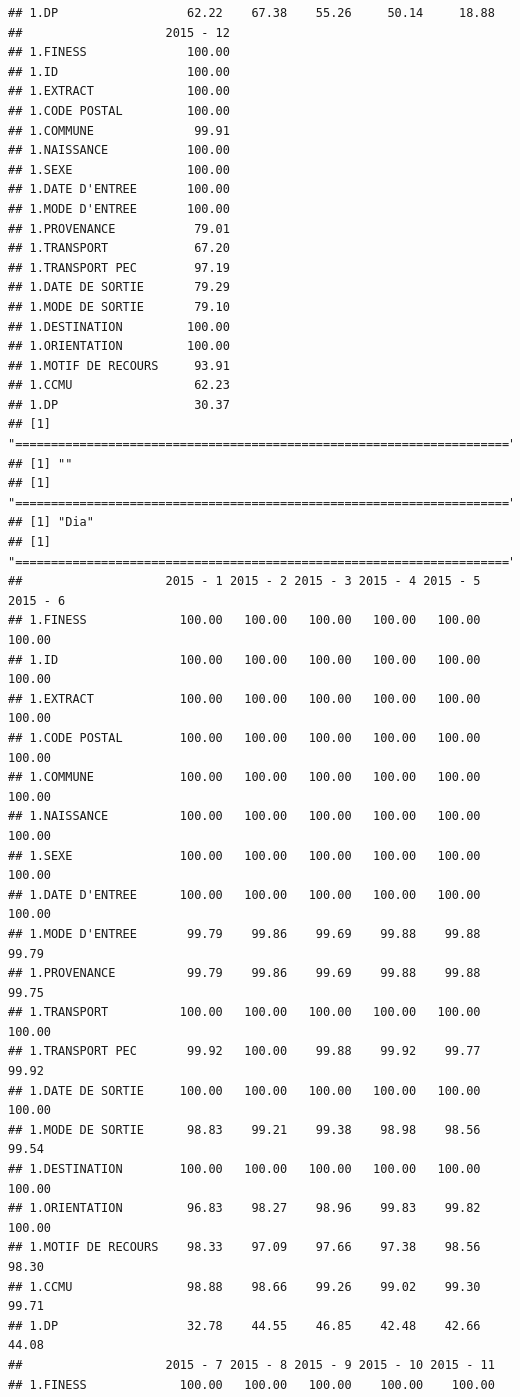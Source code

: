 \documentclass[]{article}
\begin{document}
\begin{verbatim}
## 1.DP                  62.22    67.38    55.26     50.14     18.88
##                    2015 - 12
## 1.FINESS              100.00
## 1.ID                  100.00
## 1.EXTRACT             100.00
## 1.CODE POSTAL         100.00
## 1.COMMUNE              99.91
## 1.NAISSANCE           100.00
## 1.SEXE                100.00
## 1.DATE D'ENTREE       100.00
## 1.MODE D'ENTREE       100.00
## 1.PROVENANCE           79.01
## 1.TRANSPORT            67.20
## 1.TRANSPORT PEC        97.19
## 1.DATE DE SORTIE       79.29
## 1.MODE DE SORTIE       79.10
## 1.DESTINATION         100.00
## 1.ORIENTATION         100.00
## 1.MOTIF DE RECOURS     93.91
## 1.CCMU                 62.23
## 1.DP                   30.37
## [1] "====================================================================="
## [1] ""
## [1] "====================================================================="
## [1] "Dia"
## [1] "====================================================================="
##                    2015 - 1 2015 - 2 2015 - 3 2015 - 4 2015 - 5 2015 - 6
## 1.FINESS             100.00   100.00   100.00   100.00   100.00   100.00
## 1.ID                 100.00   100.00   100.00   100.00   100.00   100.00
## 1.EXTRACT            100.00   100.00   100.00   100.00   100.00   100.00
## 1.CODE POSTAL        100.00   100.00   100.00   100.00   100.00   100.00
## 1.COMMUNE            100.00   100.00   100.00   100.00   100.00   100.00
## 1.NAISSANCE          100.00   100.00   100.00   100.00   100.00   100.00
## 1.SEXE               100.00   100.00   100.00   100.00   100.00   100.00
## 1.DATE D'ENTREE      100.00   100.00   100.00   100.00   100.00   100.00
## 1.MODE D'ENTREE       99.79    99.86    99.69    99.88    99.88    99.79
## 1.PROVENANCE          99.79    99.86    99.69    99.88    99.88    99.75
## 1.TRANSPORT          100.00   100.00   100.00   100.00   100.00   100.00
## 1.TRANSPORT PEC       99.92   100.00    99.88    99.92    99.77    99.92
## 1.DATE DE SORTIE     100.00   100.00   100.00   100.00   100.00   100.00
## 1.MODE DE SORTIE      98.83    99.21    99.38    98.98    98.56    99.54
## 1.DESTINATION        100.00   100.00   100.00   100.00   100.00   100.00
## 1.ORIENTATION         96.83    98.27    98.96    99.83    99.82   100.00
## 1.MOTIF DE RECOURS    98.33    97.09    97.66    97.38    98.56    98.30
## 1.CCMU                98.88    98.66    99.26    99.02    99.30    99.71
## 1.DP                  32.78    44.55    46.85    42.48    42.66    44.08
##                    2015 - 7 2015 - 8 2015 - 9 2015 - 10 2015 - 11
## 1.FINESS             100.00   100.00   100.00    100.00    100.00

\end{verbatim}
\end{document}
